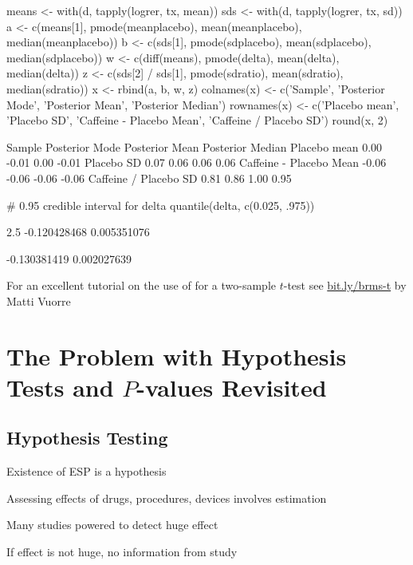 \begin{Schunk}
\begin{Sinput}
means <- with(d, tapply(logrer, tx, mean))
sds   <- with(d, tapply(logrer, tx, sd))
a <- c(means[1],    pmode(meanplacebo), mean(meanplacebo), median(meanplacebo))
b <- c(sds[1],      pmode(sdplacebo),   mean(sdplacebo),   median(sdplacebo))
w <- c(diff(means), pmode(delta),     mean(delta),     median(delta))
z <- c(sds[2] / sds[1], pmode(sdratio), mean(sdratio), median(sdratio))
x <- rbind(a, b, w, z)
colnames(x) <- c('Sample', 'Posterior Mode', 'Posterior Mean',
                 'Posterior Median')
rownames(x) <- c('Placebo mean', 'Placebo SD', 'Caffeine - Placebo Mean',
                 'Caffeine / Placebo SD')
round(x, 2)
\end{Sinput}
\begin{Soutput}
                        Sample Posterior Mode Posterior Mean Posterior Median
Placebo mean              0.00          -0.01           0.00            -0.01
Placebo SD                0.07           0.06           0.06             0.06
Caffeine - Placebo Mean  -0.06          -0.06          -0.06            -0.06
Caffeine / Placebo SD     0.81           0.86           1.00             0.95
\end{Soutput}
\begin{Sinput}
# 0.95 credible interval for delta
quantile(delta, c(0.025, .975))
\end{Sinput}
\begin{Soutput}
        2.5%
-0.120428468  0.005351076 
\end{Soutput}
\begin{Soutput}
[1] -0.130381419  0.002027639
\end{Soutput}
\end{Schunk}

For an excellent tutorial on the use of  for a two-sample $t$-test see \href{https://vuorre.netlify.com/post/2017/01/02/how-to-compare-two-groups-with-robust-bayesian-estimation-using-r-stan-and-brms}{bit.ly/brms-t} by Matti Vuorre


\section{The Problem with Hypothesis Tests and $P$-values Revisited}
\subsection{Hypothesis Testing}
\bi
\item Existence of ESP is a hypothesis
\item Assessing effects of drugs, procedures, devices involves
  estimation
\item Many studies powered to detect huge effect
\item If effect is not huge, no information from study
\ei

